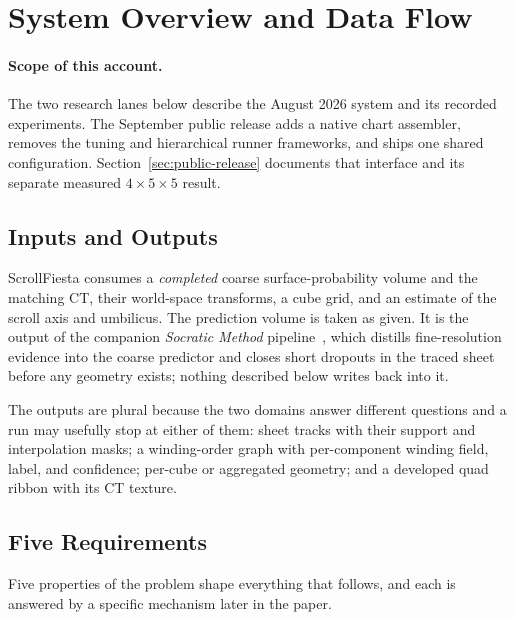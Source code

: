 \section{System Overview and Data Flow}
\label{sec:overview}

\paragraph{Scope of this account.} The two research lanes below describe the
August 2026 system and its recorded experiments. The September public release
adds a native chart assembler, removes the tuning and hierarchical runner
frameworks, and ships one shared configuration. Section~\ref{sec:public-release}
documents that interface and its separate measured $4\times5\times5$ result.

\subsection{Inputs and Outputs}
\label{sec:problem}
ScrollFiesta consumes a \emph{completed} coarse surface-probability volume and the matching CT, their world-space transforms, a cube grid, and an estimate of the scroll axis and umbilicus. The prediction volume is taken as given. It is the output of the companion \emph{Socratic Method} pipeline~\cite{socraticmethod}, which distills fine-resolution evidence into the coarse predictor and closes short dropouts in the traced sheet before any geometry exists; nothing described below writes back into it.

The outputs are plural because the two domains answer different questions and a run may usefully stop at either of them: sheet tracks with their support and interpolation masks; a winding-order graph with per-component winding field, label, and confidence; per-cube or aggregated geometry; and a developed quad ribbon with its CT texture.

\subsection{Five Requirements}

Five properties of the problem shape everything that follows, and each is answered by a specific mechanism later in the paper.

